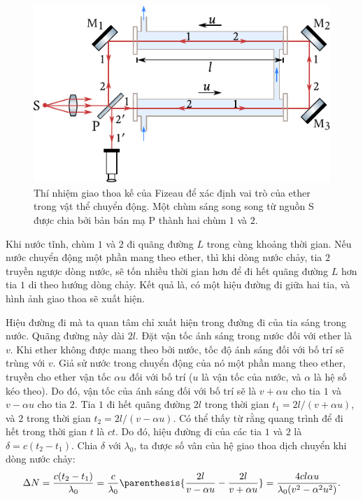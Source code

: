 \begin{figure}[!htb]
	\begin{center}
		\includegraphics[scale=1]{figures/ch_21/fig_21_3.pdf}
        \caption[]{Thí nhiệm giao thoa kế của Fizeau để xác định vai trò của ether trong vật thể chuyển động. Một chùm sáng song song từ nguồn S được chia bởi bản bán mạ P thành hai chùm $1$ và $2$.}
		\label{fig:21_3}
	\end{center}
	\vspace{-0.8cm}
\end{figure}

Khi nước tĩnh, chùm $1$ và $2$ đi quãng đường $L$ trong cùng khoảng thời gian.
Nếu nước chuyển động một phần mang theo ether, thì khi dòng nước chảy, tia $2$ truyền ngược dòng nước, sẽ tốn nhiều thời gian hơn để đi hết quãng đường $L$ hơn tia $1$ di theo hướng dòng chảy.
Kết quả là, có một hiệu đường đi giữa hai tia, và hình ảnh giao thoa sẽ xuất hiện.

Hiệu đường đi mà ta quan tâm chỉ xuất hiện trong đường đi của tia sáng trong nước.
Quãng đường này dài $2l$.
Đặt vận tốc ánh sáng trong nước đối với ether là $v$.
Khi ether không được mang theo bởi nước, tốc độ ánh sáng đối với bố trí sẽ trùng với $v$.
Giả sử nước trong chuyển động của nó một phần mang theo ether, truyền cho ether vận tốc $\alpha u$ đối với bố trí ($u$ là vận tốc của nước, và $\alpha$ là hệ số kéo theo).
Do đó, vận tốc của ánh sáng đối với bố trí sẽ là $v+\alpha u$ cho tia $1$ và $v-\alpha u$ cho tia $2$.
Tia $1$ đi hết quãng đường $2l$ trong thời gian $t_1=2l/(v+\alpha u)$, và $2$ trong thời gian $t_2=2l/(v-\alpha u)$.
Có thể thấy từ  rằng quang trình để đi hết trong thời gian $t$ là $ct$.
Do đó, hiệu đường đi của các tia $1$ và $2$ là $\delta=c(t_2-t_1)$.
Chia $\delta$ với $\lambda_0$, ta được số vân của hệ giao thoa dịch chuyển khi dòng nước chảy:
\begin{equation*}
	\Delta{N} = \frac{c(t_2-t_1)}{\lambda_0} = \frac{c}{\lambda_0} \parenthesis{\frac{2l}{v-\alpha u} - \frac{2l}{v+\alpha u}} = \frac{4cl\alpha u}{\lambda_0 (v^2 - \alpha^2 u^2)}.
\end{equation*}

